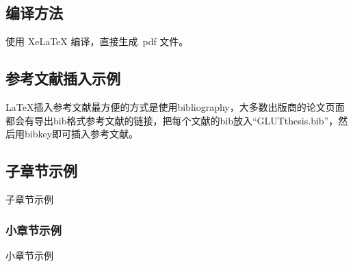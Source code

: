 \subsection{编译方法} \label{sec-compile}

使用 XeLaTeX 编译，直接生成~pdf 文件。

\subsection{参考文献插入示例}

LaTeX\cite{lamport1994latex}插入参考文献最方便的方式是使用bibliography\cite{hu2020}，大多数出版商的论文页面\cite{lamport1994latex}都会有导出bib格式参考文献的链接，把每个文献的bib放入``GLUTthesis.bib''，然后用bibkey即可插入参考文献。

\subsection{子章节示例}
子章节示例

\subsubsection{小章节示例}
小章节示例
